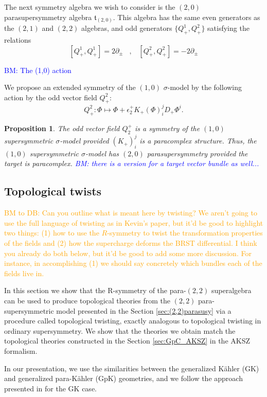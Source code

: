 \documentclass{article}
\newtheorem{proposition}[theorem]{Proposition}
\theoremstyle{definition}
\theoremstyle{remark}
\def\brian{\textcolor{blue}{BM: }\textcolor{blue}}
\def\btd{\textcolor{orange}{BM to DB: }\textcolor{orange}}
\begin{document}
The next symmetry algebra we wish to consider is the $(2,0)$ parasupersymmetry algebra $\mathfrak{t}_{(2,0)}$. 
This algebra has the same even generators as the $(2,1)$ and $(2,2)$ algebras, and odd generators $\{Q^1_+, Q^2_+\}$ satisfying the relations
\[
[Q^1_+, Q^1_+] =  2 \partial_\pm \;\;\; , \;\;\; [Q^2_+, Q^2_+] = - 2 \partial_\pm
\]

\brian{The (1,0) action}

We propose an extended symmetry of the $(1,0)$ $\sigma$-model by the following action by the odd vector field $Q_+^2$:
\[
Q^2_+ : \Phi \mapsto \Phi + \epsilon_2^+ K_+(\Phi)^j_i D_+ \Phi^i .
\]

\begin{proposition}
The odd vector field $Q_2^+$ is a symmetry of the $(1,0)$ supersymmetric $\sigma$-model provided $(K_+)^{j}_i$ is a paracomplex structure. 
Thus, the $(1,0)$ supersymmetric $\sigma$-model has $(2,0)$ parasupersymmetry provided the target is paracomplex. \brian{there is a version for a target vector bundle as well...}
\end{proposition}

\subsection{Topological twists}\label{sec:toptwist}

\btd{Can you outline what is meant here by twisting? We aren't going to use the full language of twisting as in Kevin's paper, but it'd be good to highlight two things: (1) how to use the $R$-symmetry to twist the transformation properties of the fields and (2) how the supercharge deforms the BRST differential.
I think you already do both below, but it'd be good to add some more discussion. 
For instance, in accomplishing (1) we should say concretely which bundles each of the fields live in.}

In this section we show that the R-symmetry of the para-$(2,2)$ superalgebra can be used to produce topological theories from the $(2,2)$ para-supersymmetric model presented in the Section \ref{sec:(2,2)parasusy} via a procedure called topological twisting, exactly analogous to topological twisting in ordinary supersymmetry. We show that the theories we obtain match the topological theories constructed in the Section \ref{sec:GpC_AKSZ} in the AKSZ formalism. 

In our presentation, we use the similarities between the generalized K\"{a}hler (GK) and generalized para-K\"{a}hler (GpK) geometries, and we follow the approach presented in \cite{Kapustin:2004gv} for the GK case.
\end{document}
